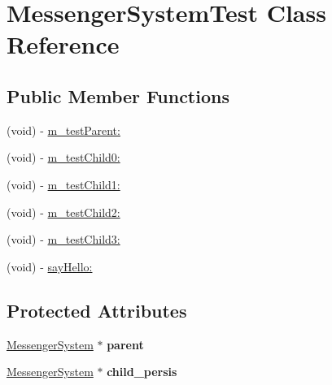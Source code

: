 \hypertarget{interface_messenger_system_test}{
\section{MessengerSystemTest Class Reference}
\label{interface_messenger_system_test}
}
\subsection*{Public Member Functions}
\begin{DoxyCompactItemize}
\item 
(void) -\/ \hyperlink{interface_messenger_system_test_ac0b879fa2580ba6ae8e38655e6dfe838}{m\_\-testParent:}
\item 
(void) -\/ \hyperlink{interface_messenger_system_test_ab2b931ec9d4901e4fd60204e53fc61e7}{m\_\-testChild0:}
\item 
(void) -\/ \hyperlink{interface_messenger_system_test_aa3be3d8e130514372c9f750349b09a6b}{m\_\-testChild1:}
\item 
(void) -\/ \hyperlink{interface_messenger_system_test_a213b69ccc26d68c90b5455e15a7d6f36}{m\_\-testChild2:}
\item 
(void) -\/ \hyperlink{interface_messenger_system_test_ae378e9658aad05348adabeaeb1bf5b8b}{m\_\-testChild3:}
\item 
(void) -\/ \hyperlink{interface_messenger_system_test_aa6fd027edc00a037b30c04fbd581d151}{sayHello:}
\end{DoxyCompactItemize}
\subsection*{Protected Attributes}
\begin{DoxyCompactItemize}
\item 
\hypertarget{interface_messenger_system_test_a57f49a12dbb0f4646ce7fa967b75bb1d}{
\hyperlink{interface_messenger_system}{MessengerSystem} $\ast$ {\bfseries parent}}
\label{interface_messenger_system_test_a57f49a12dbb0f4646ce7fa967b75bb1d}

\item 
\hypertarget{interface_messenger_system_test_a1ca38f6c6413aad838893e66b4bf79be}{
\hyperlink{interface_messenger_system}{MessengerSystem} $\ast$ {\bfseries child\_\-persis}}
\label{interface_messenger_system_test_a1ca38f6c6413aad838893e66b4bf79be}

\end{DoxyCompactItemize}


